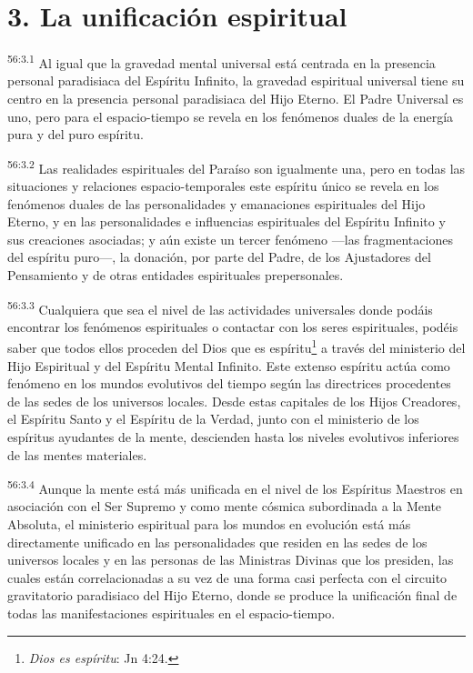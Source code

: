 \section*{3. La unificación espiritual}
\par
\textsuperscript{56:3.1} Al igual que la gravedad mental universal está centrada en la presencia personal paradisiaca del Espíritu Infinito, la gravedad espiritual universal tiene su centro en la presencia personal paradisiaca del Hijo Eterno. El Padre Universal es uno, pero para el espacio-tiempo se revela en los fenómenos duales de la energía pura y del puro espíritu.

\par
\textsuperscript{56:3.2} Las realidades espirituales del Paraíso son igualmente una, pero en todas las situaciones y relaciones espacio-temporales este espíritu único se revela en los fenómenos duales de las personalidades y emanaciones espirituales del Hijo Eterno, y en las personalidades e influencias espirituales del Espíritu Infinito y sus creaciones asociadas; y aún existe un tercer fenómeno ---las fragmentaciones del espíritu puro---, la donación, por parte del Padre, de los Ajustadores del Pensamiento y de otras entidades espirituales prepersonales.

\par
\textsuperscript{56:3.3} Cualquiera que sea el nivel de las actividades universales donde podáis encontrar los fenómenos espirituales o contactar con los seres espirituales, podéis saber que todos ellos proceden del Dios que es espíritu\footnote{\textit{Dios es espíritu}: Jn 4:24.} a través del ministerio del Hijo Espiritual y del Espíritu Mental Infinito. Este extenso espíritu actúa como fenómeno en los mundos evolutivos del tiempo según las directrices procedentes de las sedes de los universos locales. Desde estas capitales de los Hijos Creadores, el Espíritu Santo y el Espíritu de la Verdad, junto con el ministerio de los espíritus ayudantes de la mente, descienden hasta los niveles evolutivos inferiores de las mentes materiales.

\par
\textsuperscript{56:3.4} Aunque la mente está más unificada en el nivel de los Espíritus Maestros en asociación con el Ser Supremo y como mente cósmica subordinada a la Mente Absoluta, el ministerio espiritual para los mundos en evolución está más directamente unificado en las personalidades que residen en las sedes de los universos locales y en las personas de las Ministras Divinas que los presiden, las cuales están correlacionadas a su vez de una forma casi perfecta con el circuito gravitatorio paradisiaco del Hijo Eterno, donde se produce la unificación final de todas las manifestaciones espirituales en el espacio-tiempo.

